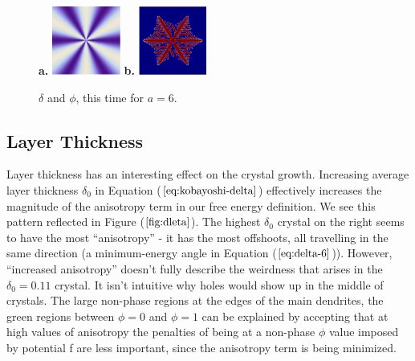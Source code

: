 \documentclass[10pt]{article} %
\begin{document}
\begin{figure}[h!]
  \centering
  \textbf{a. }\includegraphics[width=0.2\textwidth]{../radial-anisotropy-6.png}
  \hspace{1cm}\textbf{b. }\includegraphics[width=0.2\textwidth]{../anis-6.png}
  \caption{$\delta$ and $\phi$, this time for $a=6$.}
  \label{fig:r-delta-6}
\end{figure}

\subsection{Layer Thickness}
Layer thickness has an interesting effect on the crystal growth. Increasing average layer thickness $\delta_0$ in Equation ($\ref{eq:kobayoshi-delta}$) effectively increases the magnitude of the anisotropy term in our free energy definition. We see this pattern reflected in Figure ($\ref{fig:dleta}$). The highest $\delta_0$ crystal on the right seems to have the most ``anisotropy'' - it has the most offshoots, all travelling in the same direction (a minimum-energy angle in Equation ($\ref{eq:delta-6}$)). However, ``increased anisotropy'' doesn't fully describe the weirdness that arises in the $\delta_0 = 0.11$ crystal. It isn't intuitive why holes would show up in the middle of crystals. The large non-phase regions at the edges of the main dendrites, the green regions between $\phi=0$ and $\phi=1$ can be explained by accepting that at high values of anisotropy the penalties of being at a non-phase $\phi$ value imposed by potential f are less important, since the anisotropy term is being minimized.\\
\end{document}
